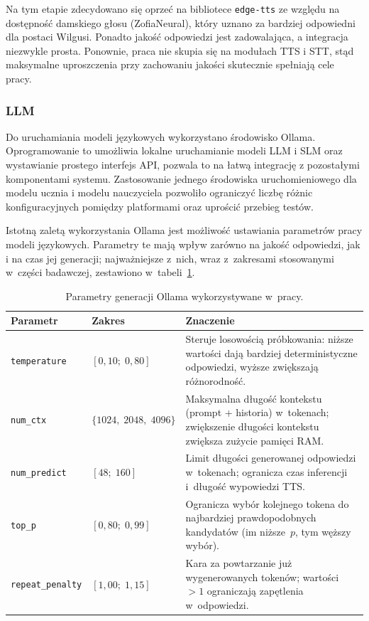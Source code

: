 Na tym etapie zdecydowano się oprzeć na bibliotece \texttt{edge-tts} ze względu na dostępność damskiego głosu (ZofiaNeural), który uznano za bardziej odpowiedni dla postaci Wilgusi. Ponadto jakość odpowiedzi jest zadowalająca, a integracja niezwykle prosta. Ponownie, praca nie skupia się na modułach TTS i STT, stąd maksymalne uproszczenia przy zachowaniu jakości skutecznie spełniają cele pracy.


\subsubsection{LLM}

Do uruchamiania modeli językowych wykorzystano środowisko Ollama. Oprogramowanie to umożliwia lokalne uruchamianie modeli LLM i SLM oraz wystawianie prostego interfejs API, pozwala to na łatwą integrację z pozostałymi komponentami systemu. Zastosowanie jednego środowiska uruchomieniowego dla modelu ucznia i modelu nauczyciela pozwoliło ograniczyć liczbę różnic konfiguracyjnych pomiędzy platformami oraz uprościć przebieg testów.

Istotną zaletą wykorzystania Ollama jest możliwość ustawiania parametrów pracy modeli językowych. Parametry te mają wpływ zarówno na jakość odpowiedzi, jak i na czas jej generacji; najważniejsze z~nich, wraz z~zakresami stosowanymi w~części badawczej, zestawiono w~tabeli~\ref{tab:ollama_parametry}.

\begin{table}[H]
  \centering
  \caption{Parametry generacji Ollama wykorzystywane w~pracy.}
  \label{tab:ollama_parametry}
  \begin{tabular}{llp{7.2cm}}
    \hline
    Parametr & Zakres & Znaczenie \\
    \hline
    \texttt{temperature} & $[0{,}10;\; 0{,}80]$ &
      Steruje losowością próbkowania: niższe wartości dają bardziej
      deterministyczne odpowiedzi, wyższe zwiększają różnorodność. \\
    \texttt{num\_ctx} & $\{1024,\; 2048,\; 4096\}$ &
      Maksymalna długość kontekstu (prompt + historia) w~tokenach;
      zwiększenie długości kontekstu zwiększa zużycie pamięci RAM. \\
    \texttt{num\_predict} & $[48;\; 160]$ &
      Limit długości generowanej odpowiedzi w~tokenach;
      ogranicza czas inferencji i~długość wypowiedzi TTS. \\
    \texttt{top\_p} & $[0{,}80;\; 0{,}99]$ &
      Ogranicza wybór kolejnego tokena do najbardziej
      prawdopodobnych kandydatów (im niższe~$p$, tym węższy wybór). \\
    \texttt{repeat\_penalty} & $[1{,}00;\; 1{,}15]$ &
      Kara za powtarzanie już wygenerowanych tokenów;
      wartości $>1$ ograniczają zapętlenia w~odpowiedzi. \\
    \hline
  \end{tabular}
\end{table}


